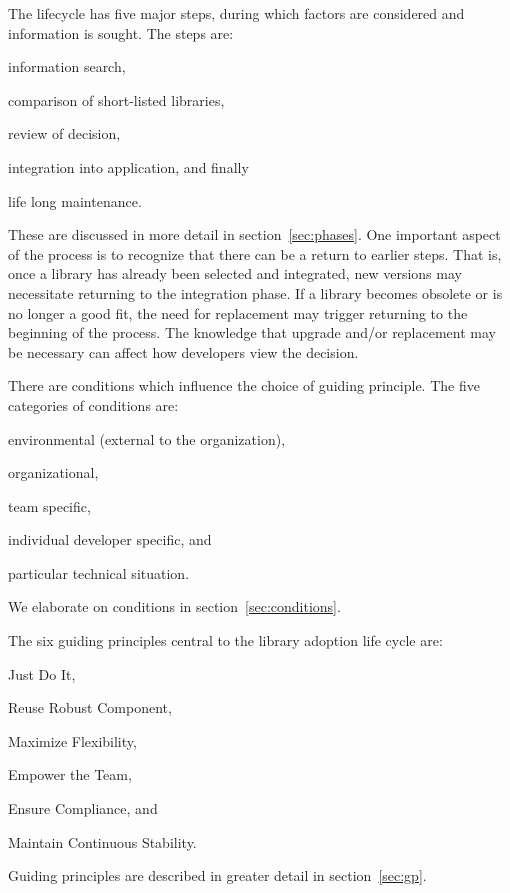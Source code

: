 The lifecycle has five major steps, during which factors are considered and information is sought. The steps are:
\begin{inparaenum}[(P1)] 
\item information search, 
\item comparison of short-listed libraries, 
\item review of decision, 
\item integration into application, and finally 
\item life long maintenance.
\end{inparaenum} 
These are discussed in more detail in section~\ref{sec:phases}. One important aspect of the process is to recognize that there can be a return to earlier steps. That is, once a library has already been selected and integrated, new versions may necessitate returning to the integration phase. If a library becomes obsolete or is no longer a good fit, the need for replacement may trigger returning to the beginning of the process. The knowledge that upgrade and/or replacement may be necessary can affect how developers view the decision.

There are conditions which influence the choice of guiding principle.  The five categories of conditions are:
\begin{inparaenum}[(C1)] 
\item environmental (external to the organization), 
\item organizational, 
\item team specific, 
\item individual developer specific, and 
\item particular technical situation. 
\end{inparaenum} 
We elaborate on conditions in section~\ref{sec:conditions}.

The six guiding principles central to the library adoption life cycle are: 
\begin{inparaenum}[(GP1)] 
\item Just Do It, 
\item Reuse Robust Component, 
\item Maximize Flexibility, 
\item Empower the Team, 
\item Ensure Compliance, and
\item Maintain Continuous Stability. 
\end{inparaenum} 
Guiding principles are described in greater detail in section~\ref{sec:gp}.

